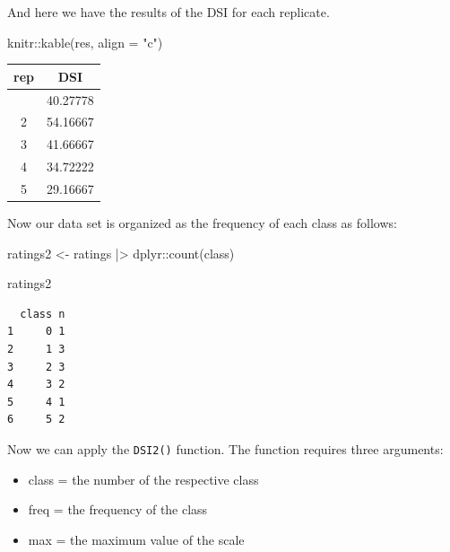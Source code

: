 \documentclass[
  letterpaper,
]{book}
\newenvironment{Shaded}{\begin{snugshade}}{\end{snugshade}}
\newcommand{\AttributeTok}[1]{\textcolor[rgb]{0.40,0.45,0.13}{#1}}
\newcommand{\DecValTok}[1]{\textcolor[rgb]{0.68,0.00,0.00}{#1}}
\newcommand{\FunctionTok}[1]{\textcolor[rgb]{0.28,0.35,0.67}{#1}}
\newcommand{\NormalTok}[1]{\textcolor[rgb]{0.00,0.23,0.31}{#1}}
\newcommand{\OtherTok}[1]{\textcolor[rgb]{0.00,0.23,0.31}{#1}}
\newcommand{\SpecialCharTok}[1]{\textcolor[rgb]{0.37,0.37,0.37}{#1}}
\newcommand{\StringTok}[1]{\textcolor[rgb]{0.13,0.47,0.30}{#1}}
\providecommand{\tightlist}{%
  \setlength{\itemsep}{0pt}\setlength{\parskip}{0pt}}\usepackage{longtable,booktabs,array}
\begin{document}
And here we have the results of the DSI for each replicate.

\begin{Shaded}
\begin{Highlighting}[]
\NormalTok{knitr}\SpecialCharTok{::}\FunctionTok{kable}\NormalTok{(res, }\AttributeTok{align =} \StringTok{"c"}\NormalTok{)}
\end{Highlighting}
\end{Shaded}

\begin{longtable}[]{@{}cc@{}}
\toprule\noalign{}
rep & DSI \\
\midrule\noalign{}
\endhead
\bottomrule\noalign{}
\endlastfoot
1 & 40.27778 \\
2 & 54.16667 \\
3 & 41.66667 \\
4 & 34.72222 \\
5 & 29.16667 \\
\end{longtable}

Now our data set is organized as the frequency of each class as follows:

\begin{Shaded}
\begin{Highlighting}[]
\NormalTok{ratings2 }\OtherTok{\textless{}{-}}\NormalTok{ ratings }\SpecialCharTok{|\textgreater{}} 
\NormalTok{  dplyr}\SpecialCharTok{::}\FunctionTok{count}\NormalTok{(class)}

\NormalTok{ratings2}
\end{Highlighting}
\end{Shaded}

\begin{verbatim}
  class n
1     0 1
2     1 3
3     2 3
4     3 2
5     4 1
6     5 2
\end{verbatim}

Now we can apply the \texttt{DSI2()} function. The function requires
three arguments:

\begin{itemize}
\tightlist
\item
  class = the number of the respective class
\item
  freq = the frequency of the class
\item
  max = the maximum value of the scale
\end{itemize}

\begin{Shaded}
\end{Shaded}
\end{document}
